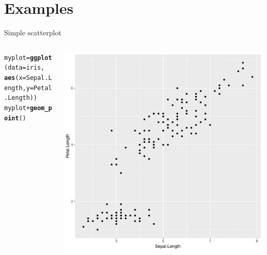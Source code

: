 \documentclass[aspectratio=169]{beamer}\usepackage[]{graphicx}\usepackage[]{color}
\makeatletter
\def\maxwidth{ %
  \ifdim\Gin@nat@width>\linewidth
    \linewidth
  \else
    \Gin@nat@width
  \fi
}
\newcommand{\hlopt}[1]{\textcolor[rgb]{0,0,0}{#1}}%
\newcommand{\hlstd}[1]{\textcolor[rgb]{0.345,0.345,0.345}{#1}}%
\newcommand{\hlkwb}[1]{\textcolor[rgb]{0.69,0.353,0.396}{#1}}%
\newcommand{\hlkwc}[1]{\textcolor[rgb]{0.333,0.667,0.333}{#1}}%
\newcommand{\hlkwd}[1]{\textcolor[rgb]{0.737,0.353,0.396}{\textbf{#1}}}%
\newenvironment{kframe}{%
 \def\at@end@of@kframe{}%
 \ifinner\ifhmode%
  \def\at@end@of@kframe{\end{minipage}}%
  \begin{minipage}{\columnwidth}%
 \fi\fi%
 \def\FrameCommand##1{\hskip\@totalleftmargin \hskip-\fboxsep
 \colorbox{shadecolor}{##1}\hskip-\fboxsep
     \hskip-\linewidth \hskip-\@totalleftmargin \hskip\columnwidth}%
 \MakeFramed {\advance\hsize-\width
   \@totalleftmargin\z@ \linewidth\hsize
   \@setminipage}}%
 {\par\unskip\endMakeFramed%
 \at@end@of@kframe}
\newenvironment{knitrout}{}{} %
\makeatother
\begin{document}
\section{Examples}
\begin{frame}[fragile]{Simple scatterplot}
\begin{columns}
  \begin{column}{0.50\textwidth}
\begin{knitrout}\tiny
{}\color{fgcolor}\begin{kframe}
\begin{alltt}
\hlstd{myplot} \hlkwb{=} \hlkwd{ggplot}\hlstd{(}\hlkwc{data}\hlstd{=iris,}
                \hlkwd{aes}\hlstd{(}\hlkwc{x}\hlstd{=Sepal.Length,} \hlkwc{y}\hlstd{=Petal.Length))}
\hlstd{myplot} \hlopt{+} \hlkwd{geom_point}\hlstd{()}
\end{alltt}
\end{kframe}
\end{knitrout}
  \end{column}
  \begin{column}{0.5\textwidth}

\begin{knitrout}\scriptsize
{}\color{fgcolor}
\includegraphics[width=\maxwidth]{figure/unnamed-chunk-5-1} 

\end{knitrout}
  \end{column}
\end{columns}
\end{frame}
\end{document}
